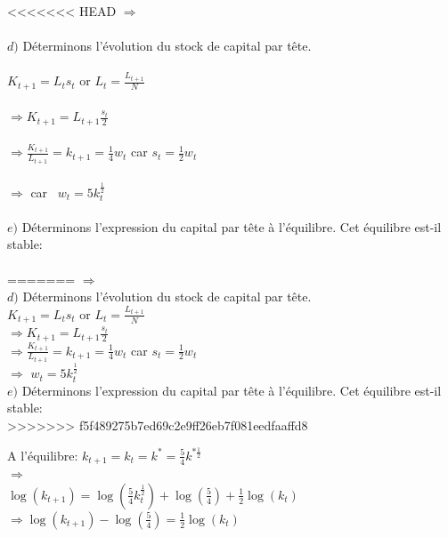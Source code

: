 \documentclass[11pt,twoside,a4paper]{article}
\begin{document}
<<<<<<< HEAD
$ \Rightarrow$   \\ \\
$d)$ Déterminons l'évolution du stock de capital par tête.\\\\
$K_{t+1}=L_t s_t$ \: or \: $L_t=\frac{L_{t+1}}{N}$\\\\
$\Rightarrow  K_{t+1}=L_{t+1}\frac{s_t}{2}$\\\\
$\Rightarrow \frac{K_{t+1}}{L_{t+1}}=k_{t+1}=\frac{1}{4}w_t$ \: car $s_t = \frac{1}{2} w_t $\\\\
$ \Rightarrow$   \: car \ $w_t = 5k_t^{\frac{1}{2}} $\\\\
$e)$ Déterminons l'expression du capital par tête à l'équilibre. Cet équilibre
est-il stable:\\\\
=======
$ \Rightarrow$   \\

$d)$ Déterminons l'évolution du stock de capital par tête.\\
$K_{t+1}=L_t s_t$ \: or \: $L_t=\frac{L_{t+1}}{N}$\\
$\Rightarrow  K_{t+1}=L_{t+1}\frac{s_t}{2}$\\
$\Rightarrow \frac{K_{t+1}}{L_{t+1}}=k_{t+1}=\frac{1}{4}w_t$ \: car $s_t = \frac{1}{2} w_t $\\
$ \Rightarrow$   \: $w_t = 5k_t^{\frac{1}{2}} $\\

$e)$ Déterminons l'expression du capital par tête à l'équilibre. Cet équilibre
est-il stable:\\
>>>>>>> f5f489275b7ed69c2e9ff26eb7f081eedfaaffd8

A l'équilibre: \: $k_{t+1}=k_t=k^*=\frac{5}{4}k^{*\frac{1}{2}}$\\

$ \Rightarrow$   \\

$\log{(k_{t+1})}=\log{(\frac{5}{4}k_t^{\frac{1}{2}})}+\log{(\frac{5}{4})}+\frac{1}{2}\log{(k_t)}$\\

$
\Rightarrow \log{(k_{t+1})} -\log{(\frac{5}{4})}=\frac{1}{2}\log{(k_t)}$\\
\end{document}
